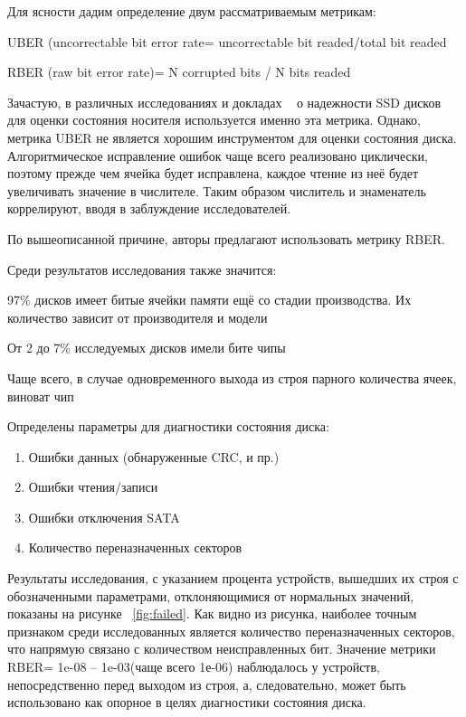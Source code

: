 Для ясности дадим определение двум рассматриваемым метрикам:
\begin{itemize*}
	\item{UBER (uncorrectable bit error rate= uncorrectable bit readed/total bit readed}
	\item{RBER (raw bit error rate)= N corrupted bits / N bits readed}
\end{itemize*}
Зачастую, в различных исследованиях и докладах ~\cite{art} о надежности SSD дисков для оценки состояния носителя используется именно эта метрика. 
Однако, метрика UBER не является хорошим инструментом для оценки состояния диска. Алгоритмическое исправление ошибок чаще всего реализовано циклически, поэтому прежде чем ячейка будет исправлена, каждое чтение из неё будет увеличивать значение в числителе. Таким образом числитель и знаменатель коррелируют, вводя в заблуждение исследователей. 

По вышеописанной причине, авторы предлагают использовать метрику RBER. 


Среди результатов исследования также значится:
\begin{itemize*}
	\item{97\% дисков имеет битые ячейки памяти ещё со стадии производства. Их количество зависит от производителя и модели} 
    \item{От 2 до 7\% исследуемых дисков имели бите чипы}
    \item{Чаще всего, в случае одновременного выхода из строя парного количества ячеек, виноват чип} 
    \item{Определены параметры для диагностики состояния диска:}
	\begin{enumerate}
		\item{Ошибки данных (обнаруженные CRC, и пр.)}
		\item{Ошибки чтения/записи}
		\item{Ошибки отключения SATA}
		\item{Количество переназначенных секторов}
	\end{enumerate}
\end{itemize*}

Результаты исследования, с указанием процента устройств, вышедших их строя с обозначенными параметрами, отклоняющимися от нормальных значений, показаны на рисунке ~\ref{fig:failed}. Как видно из рисунка, наиболее точным признаком среди исследованных является количество переназначенных секторов, что напрямую связано с количеством неисправленных бит.
Значение метрики RBER= 1e-08 – 1e-03(чаще всего 1е-06) наблюдалось у устройств, непосредственно перед выходом из строя, а, следовательно, может быть использовано как опорное в целях диагностики состояния диска.

